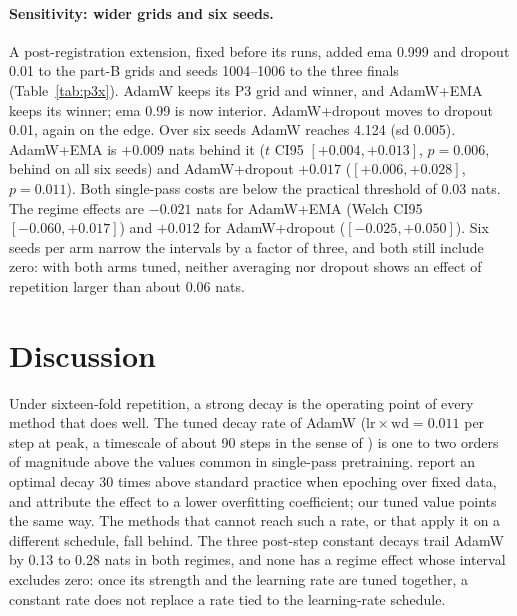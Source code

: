 \documentclass[twoside,11pt]{article}
\newcommand{\wdec}{\mathrm{wd}}
\begin{document}
\begin{table}[t]
\centering
\footnotesize
\resizebox{\textwidth}{!}{}
\caption{Sensitivity analysis P3x (post-registration): part B of P3 with the averaging coefficient extended to 0.999, the dropout rate to 0.01, and final seeds 1001--1006. Contrasts are method $-$ AdamW in nats, paired over seeds. The R16 contrasts are the six-seed runs of Section~\ref{sec:seeds}. The regime effect has a Welch $t$ CI95.}
\label{tab:p3x}
\end{table}

\paragraph{Sensitivity: wider grids and six seeds.} A post-registration extension, fixed before its runs, added ema 0.999 and dropout 0.01 to the part-B grids and seeds 1004--1006 to the three finals (Table~\ref{tab:p3x}). AdamW keeps its P3 grid and winner, and AdamW+EMA keeps its winner; ema 0.99 is now interior. AdamW+dropout moves to dropout 0.01, again on the edge. Over six seeds AdamW reaches 4.124 (sd 0.005). AdamW+EMA is $+0.009$ nats behind it ($t$ CI95 $[+0.004, +0.013]$, $p = 0.006$, behind on all six seeds) and AdamW+dropout $+0.017$ ($[+0.006, +0.028]$, $p = 0.011$). Both single-pass costs are below the practical threshold of 0.03 nats. The regime effects are $-0.021$ nats for AdamW+EMA (Welch CI95 $[-0.060, +0.017]$) and $+0.012$ for AdamW+dropout ($[-0.025, +0.050]$). Six seeds per arm narrow the intervals by a factor of three, and both still include zero: with both arms tuned, neither averaging nor dropout shows an effect of repetition larger than about 0.06 nats.

\section{Discussion}
\label{sec:discussion}

Under sixteen-fold repetition, a strong decay is the operating point of every method that does well. The tuned decay rate of AdamW ($\mathrm{lr} \times \wdec = 0.011$ per step at peak, a timescale of about 90 steps in the sense of \citealt{wang2024adamw}) is one to two orders of magnitude above the values common in single-pass pretraining. \citet{kim2026infinite} report an optimal decay 30 times above standard practice when epoching over fixed data, and \citet{lovelace2026prescriptive} attribute the effect to a lower overfitting coefficient; our tuned value points the same way. The methods that cannot reach such a rate, or that apply it on a different schedule, fall behind. The three post-step constant decays trail AdamW by 0.13 to 0.28 nats in both regimes, and none has a regime effect whose interval excludes zero: once its strength and the learning rate are tuned together, a constant rate does not replace a rate tied to the learning-rate schedule.
\end{document}
